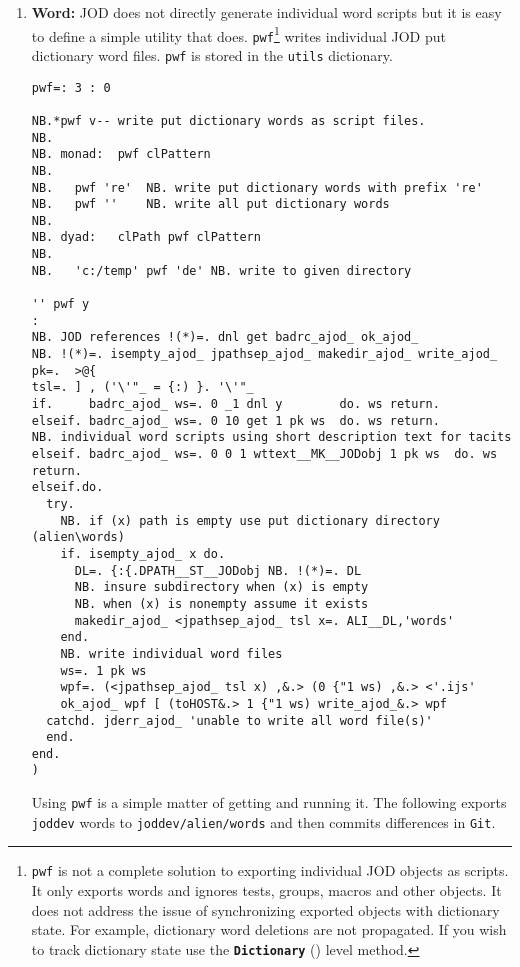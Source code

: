 \begin{enumerate}
\item \textbf{Word:} JOD does not directly generate individual word scripts 
but it is easy to define
a simple utility that does. \texttt{pwf}\footnote{
\texttt{pwf} is not a complete solution to exporting 
individual JOD objects as scripts. It only exports words
 and ignores tests, groups, macros and other objects.
It does not address the issue of synchronizing exported
objects with dictionary state. For example, dictionary word
deletions are not propagated. If you wish to track 
dictionary state use the \textbf{\texttt{Dictionary}} (\pageref{it:dictlev})
level method.}
writes individual JOD put dictionary
word files. \texttt{pwf} is stored in the \texttt{utils} dictionary.

\begin{lstlisting}[frame=single,framerule=0pt,basicstyle=\ttfamily\footnotesize]
pwf=: 3 : 0

NB.*pwf v-- write put dictionary words as script files.
NB.
NB. monad:  pwf clPattern
NB.
NB.   pwf 're'  NB. write put dictionary words with prefix 're'
NB.   pwf ''    NB. write all put dictionary words
NB.
NB. dyad:   clPath pwf clPattern
NB.
NB.   'c:/temp' pwf 'de' NB. write to given directory

'' pwf y
:
NB. JOD references !(*)=. dnl get badrc_ajod_ ok_ajod_ 
NB. !(*)=. isempty_ajod_ jpathsep_ajod_ makedir_ajod_ write_ajod_
pk=.  >@{                        
tsl=. ] , ('\'"_ = {:) }. '\'"_  
if.     badrc_ajod_ ws=. 0 _1 dnl y        do. ws return.
elseif. badrc_ajod_ ws=. 0 10 get 1 pk ws  do. ws return.
NB. individual word scripts using short description text for tacits
elseif. badrc_ajod_ ws=. 0 0 1 wttext__MK__JODobj 1 pk ws  do. ws return.
elseif.do.
  try.
    NB. if (x) path is empty use put dictionary directory (alien\words)
    if. isempty_ajod_ x do.
      DL=. {:{.DPATH__ST__JODobj NB. !(*)=. DL
      NB. insure subdirectory when (x) is empty 
      NB. when (x) is nonempty assume it exists
      makedir_ajod_ <jpathsep_ajod_ tsl x=. ALI__DL,'words'
    end.
    NB. write individual word files
    ws=. 1 pk ws
    wpf=. (<jpathsep_ajod_ tsl x) ,&.> (0 {"1 ws) ,&.> <'.ijs'
    ok_ajod_ wpf [ (toHOST&.> 1 {"1 ws) write_ajod_&.> wpf
  catchd. jderr_ajod_ 'unable to write all word file(s)'
  end.
end.
)
\end{lstlisting}

Using \texttt{pwf} is a simple matter of getting and running it.  The following
exports  \texttt{joddev} words  to \verb|joddev/alien/words| 
and then commits differences in \texttt{Git}.


\end{enumerate}
